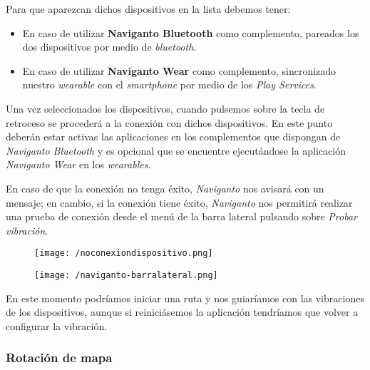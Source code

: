 Para que aparezcan dichos dispositivos en la lista debemos tener:

\begin{itemize}
  \item En caso de utilizar \textbf{Naviganto Bluetooth} como complemento, pareados los dos
    dispositivos por medio de \emph{bluetooth}.
  \item En caso de utilizar \textbf{Naviganto Wear} como complemento, sincronizado nuestro
    \emph{wearable} con el \emph{smartphone} por medio de los \emph{Play Services}.
\end{itemize}

Una vez seleccionados los dispositivos, cuando pulsemos sobre la tecla de retroceso se procederá a
la conexión con dichos dispositivos. En este punto deberán estar activas las aplicaciones en los
complementos que dispongan de \emph{Naviganto Bluetooth} y es opcional que se encuentre ejecutándose
la aplicación \emph{Naviganto Wear} en los \emph{wearables}.

\newpage
En caso de que la conexión no tenga éxito, \emph{Naviganto} nos avisará con un mensaje; en cambio,
si la conexión tiene éxito, \emph{Naviganto} nos permitirá realizar una prueba de conexión desde el
menú de la barra lateral pulsando sobre \emph{Probar vibración}.

\begin{figure}[h]
  \begin{minipage}[b]{0.5\linewidth}
    \begin{center}
      \texttt{[image: /noconexiondispositivo.png]}
    \end{center}
  \end{minipage}
  \begin{minipage}[b]{0.5\linewidth}
    \begin{center}
      \texttt{[image: /naviganto-barralateral.png]}
    \end{center}
  \end{minipage}
\end{figure}

En este momento podríamos iniciar una ruta y nos guiaríamos con las vibraciones de los dispositivos,
aunque si reiniciásemos la aplicación tendríamos que volver a configurar la vibración.

\subsubsection{Rotación de mapa}

